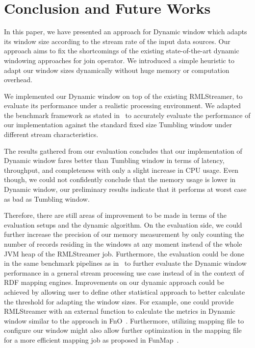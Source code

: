 \chapter{Conclusion and Future Works}%
\label{chap:Conclusion and Future Works}


In this paper, we have presented an approach for Dynamic window 
which adapts its window size according to the stream rate of the 
input data sources. Our approach aims to fix the shortcomings of 
the existing state-of-the-art dynamic windowing approaches for 
join operator. We introduced a simple heuristic to adapt our 
window sizes dynamically without huge memory or computation overhead. 

We implemented our Dynamic window on top of the existing RMLStreamer, 
to evaluate its performance under a realistic processing environment. 
We adapted the benchmark framework as stated in~\cite{evalution_of_spe} to 
accurately evaluate the performance of our implementation against the 
standard fixed size Tumbling window under different stream characteristics. 

The results gathered from our evaluation concludes that our implementation 
of Dynamic window fares better than Tumbling window in terms of 
latency, throughput, and completeness with only a slight 
increase in CPU usage. Even though, we could not confidently conclude that 
the memory usage is lower in Dynamic window, our preliminary results indicate 
that it performs at worst case as bad as Tumbling window.   

Therefore, there are still areas of improvement to be made in terms of the
evaluation setups
and the dynamic algorithm. On the evaluation side, we could further increase 
the precision of our memory measurement by only counting the number of records
residing in the windows at any moment instead of the whole JVM heap of the RMLStreamer job. 
Furthermore, the evaluation could be done in the same benchmark pipelines as in~\cite{evalution_of_spe} 
to further evaluate the Dynamic window performance in a general stream processing use case instead 
of in the context of RDF mapping engines.  
Improvements on our dynamic approach could be achieved by allowing user to 
define other statistical approach 
to better calculate the threshold for adapting the window sizes. For example, one could provide 
RMLStreamer with an external function to calculate the metrics in Dynamic window similar to the approach 
in FnO~\cite{fno_ben}. Furthermore, utilizing mapping file to configure our window might also allow further
optimization in the mapping file for a more efficient mapping job as proposed in FunMap~\cite{funmap}. 


